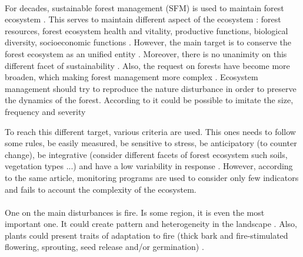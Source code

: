 \documentclass{article}
\begin{document}
\paragraph{}
For decades, sustainable forest management (SFM) is used to maintain forest ecosystem \cite{macdicken2015global}. This serves to maintain different aspect of the ecosystem : forest resources,  forest ecosystem health and vitality, productive functions, biological diversity, socioeconomic functions \cite{makela_using_2012}. However, the main target is to conserve the forest ecosystem as an unified entity \cite{franklin1989toward}.
Moreover, there is no unanimity on this different facet of sustainability \cite{martinez-vega_assessing_2016}. Also, the request on forests have become more broaden, which making forest management more complex \cite{eggers2017balancing}. Ecosystem management should try to reproduce the nature disturbance \cite{bengston_changing_1994} \cite{bengtsson2000biodiversity} in order to preserve the dynamics of the forest. According to \cite{hunter1990wildlife} \cite{hunter1988paleoecology} it could be possible to imitate the size, frequency and severity

To reach this different target, various criteria are used. This ones needs to follow some rules, be easily measured, be sensitive to stress, be anticipatory (to counter change), be integrative (consider different facets of forest ecosystem such soils, vegetation types ...) and have a low variability in response \cite{dale2001challenges}. However, according to the same article, monitoring programs are used to consider only few indicators and fails to account the complexity of the ecosystem.


\paragraph{}

One on the main disturbances is fire. Is some region, it is even the most important one. It could create pattern and heterogeneity in the landscape \cite{skinner1996fire}. Also, plants could present traits of adaptation to fire (thick  bark  and  fire-stimulated  flowering,  sprouting,  seed
release and/or germination) \cite{mckelvey1996overview} \cite{chang1996ecosystem}.
\end{document}
